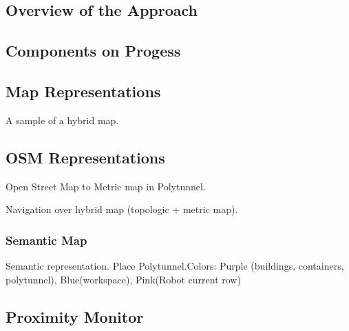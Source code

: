 \subsection*{Overview of the Approach}



\subsection*{Components on Progess}



\subsection*{Map Representations}

A sample of a hybrid map. 

\subsection*{O\+SM Representations}

Open Street Map to Metric map in Polytunnel. 

Navigation over hybrid map (topologic + metric map).  

\subsubsection*{Semantic Map}

Semantic representation. Place Polytunnel.\+Colors\+: Purple (buildings, containers, polytunnel), Blue(workspace), Pink(\+Robot current row) 

\subsection*{Proximity Monitor}

 